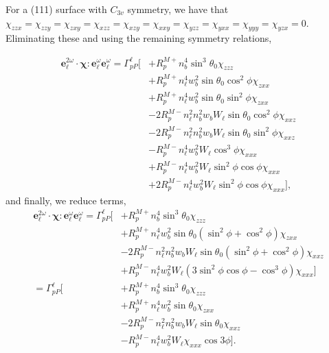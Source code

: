 \documentclass{article}
\begin{document}
For a (111) surface with $C_{3v}$ symmetry, we have that $\chi_{zzx}=\chi_{zzy}=
\chi_{zxy}=\chi_{xzz}=\chi_{xzy}=\chi_{xxy}=\chi_{yzz}=\chi_{yxx}=\chi_{yyy}=
\chi_{yzx}=0$. Eliminating these and using the remaining symmetry relations,

\begin{equation*}
\begin{split}
\mathbf{e}^{2\omega}_{\ell}\cdot\boldsymbol{\chi}:
\mathbf{e}^{\omega}_{\ell}\mathbf{e}^{\omega}_{\ell} =
\Gamma^{\ell}_{pP}
\big[
&+ R^{M+}_{p}n^{4}_{b}\sin^{3}\theta_{0}\chi_{zzz}\\
&+ R^{M+}_{p}n^{4}_{\ell}w^{2}_{b}\sin\theta_{0}\cos^{2}\phi\chi_{zxx}\\
&+ R^{M+}_{p}n^{4}_{\ell}w^{2}_{b}\sin\theta_{0}\sin^{2}\phi\chi_{zxx}\\
&- 2R^{M-}_{p}n^{2}_{\ell}n^{2}_{b}w_{b}W_{\ell}\sin\theta_{0}\cos^{2}\phi
   \chi_{xxz}\\
&- 2R^{M-}_{p}n^{2}_{\ell}n^{2}_{b}w_{b}W_{\ell}\sin\theta_{0}\sin^{2}\phi
   \chi_{xxz}\\
&- R^{M-}_{p}n^{4}_{\ell}w^{2}_{b}W_{\ell}\cos^{3}\phi\chi_{xxx}\\
&+ R^{M-}_{p}n^{4}_{\ell}w^{2}_{b}W_{\ell}\sin^{2}\phi\cos\phi\chi_{xxx}\\
&+ 2R^{M-}_{p}n^{4}_{\ell}w^{2}_{b}W_{\ell}\sin^{2}\phi\cos\phi\chi_{xxx}
\big],
\end{split}
\end{equation*}
and finally, we reduce terms,
\begin{equation*}
\begin{split}
\mathbf{e}^{2\omega}_{\ell}\cdot\boldsymbol{\chi}:
\mathbf{e}^{\omega}_{\ell}\mathbf{e}^{\omega}_{\ell} =
\Gamma^{\ell}_{pP}
\big[
&+ R^{M+}_{p}n^{4}_{b}\sin^{3}\theta_{0}\chi_{zzz}\\
&+ R^{M+}_{p}n^{4}_{\ell}w^{2}_{b}\sin\theta_{0}
   (\sin^{2}\phi+\cos^{2}\phi)\chi_{zxx}\\
&- 2R^{M-}_{p}n^{2}_{\ell}n^{2}_{b}w_{b}W_{\ell}\sin\theta_{0}
   (\sin^{2}\phi+\cos^{2}\phi)\chi_{xxz}\\
&+ R^{M-}_{p}n^{4}_{\ell}w^{2}_{b}W_{\ell}
   (3\sin^{2}\phi\cos\phi - \cos^{3}\phi)\chi_{xxx}
\big]\\
=
\Gamma^{\ell}_{pP}
\big[
&+ R^{M+}_{p}n^{4}_{b}\sin^{3}\theta_{0}\chi_{zzz}\\
&+ R^{M+}_{p}n^{4}_{\ell}w^{2}_{b}\sin\theta_{0}\chi_{zxx}\\
&- 2R^{M-}_{p}n^{2}_{\ell}n^{2}_{b}w_{b}W_{\ell}\sin\theta_{0}\chi_{xxz}\\
&- R^{M-}_{p}n^{4}_{\ell}w^{2}_{b}W_{\ell}\chi_{xxx}\cos3\phi
\big].
\end{split}
\end{equation*}
\end{document}

